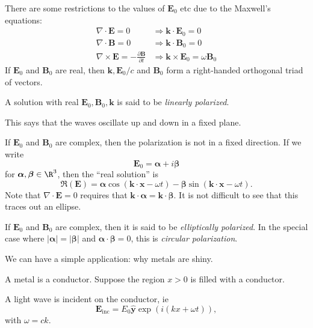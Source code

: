 \documentclass[a4paper]{article}
\begin{document}
There are some restrictions to the values of $\mathbf{E}_0$ etc due to the Maxwell's equations:
\begin{align*}
  \nabla\cdot \mathbf{E} = 0 &\Rightarrow \mathbf{k}\cdot \mathbf{E}_0 = 0\\
  \nabla\cdot \mathbf{B} = 0 &\Rightarrow \mathbf{k}\cdot \mathbf{B}_0 = 0\\
  \nabla\times \mathbf{E} = -\frac{\partial \mathbf{B}}{\partial t} &\Rightarrow \mathbf{k}\times \mathbf{E}_0 = \omega \mathbf{B}_0
\end{align*}
If $\mathbf{E}_0$ and $\mathbf{B}_0$ are real, then $\mathbf{k}, \mathbf{E}_0/c$ and $\mathbf{B}_0$ form a right-handed orthogonal triad of vectors.
\begin{defi}
  A solution with real $\mathbf{E}_0, \mathbf{B}_0, \mathbf{k}$ is said to be \emph{linearly polarized}.
\end{defi}
This says that the waves oscillate up and down in a fixed plane.

If $\mathbf{E}_0$ and $\mathbf{B}_0$ are complex, then the polarization is not in a fixed direction. If we write
\[
  \mathbf{E}_0 = \boldsymbol\alpha + i\boldsymbol\beta
\]
for $\boldsymbol\alpha, \boldsymbol\beta\in \R^3$, then the ``real solution'' is
\[
  \Re(\mathbf{E}) = \boldsymbol\alpha\cos(\mathbf{k}\cdot \mathbf{x} - \omega t) - \boldsymbol\beta \sin (\mathbf{k}\cdot \mathbf{x} - \omega t).
\]
Note that $\nabla\cdot \mathbf{E} = 0$ requires that $\mathbf{k}\cdot \boldsymbol\alpha = \mathbf{k}\cdot \boldsymbol\beta$. It is not difficult to see that this traces out an ellipse.
\begin{defi}
  If $\mathbf{E}_0$ and $\mathbf{B}_0$ are complex, then it is said to be \emph{elliptically polarized}. In the special case where $|\boldsymbol\alpha| = |\boldsymbol\beta|$ and $\boldsymbol\alpha \cdot \boldsymbol\beta = 0$, this is \emph{circular polarization}.
\end{defi}

We can have a simple application: why metals are shiny.

A metal is a conductor. Suppose the region $x > 0$ is filled with a conductor.
\begin{center}
\end{center}
A light wave is incident on the conductor, ie
\[
  \mathbf{E}_{\mathrm{inc}} = E_0 \hat{\mathbf{y}} \exp(i(kx + \omega t)),
\]
with $\omega = ck$.
\end{document}
